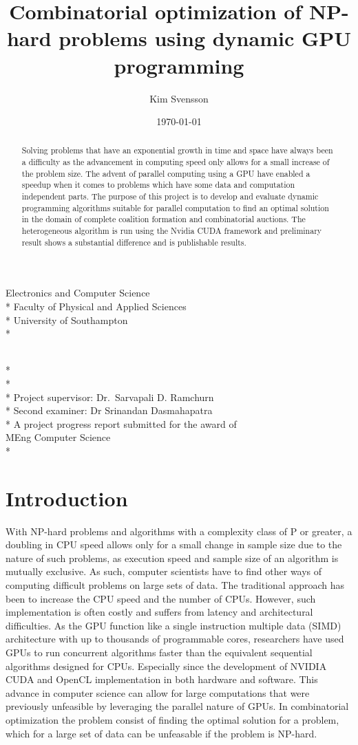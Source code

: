 \documentclass[a4paper, 12pt]{report}
\newcommand{\tdegree}{A project progress report submitted for the award of\\}
\newcommand{\degree}{\tdegree MEng Computer Science\\*}
\newcommand{\texam}{Second examiner: }
\newcommand{\exam}{\texam Dr Srinandan Dasmahapatra}
\newcommand{\tsupervisor}{Project supervisor: }
\newcommand{\supervisor}{\tsupervisor Dr.\ Sarvapali D. Ramchurn}
\newcommand{\school}{Electronics and Computer Science \\*
Faculty of Physical and Applied Sciences\\*
University of Southampton\\*}
\newenvironment{changemargin}[2]{%
\begin{list}{}{%
\setlength{\topsep}{0pt}%
\setlength{\leftmargin}{#1}%
\setlength{\rightmargin}{#2}%
\setlength{\listparindent}{\parindent}%
\setlength{\itemindent}{\parindent}%
\setlength{\parsep}{\parskip}%
}%
\item[]}{\end{list}}
\begin{document}
\author{Kim Svensson}
\date{\today}
\title{Combinatorial optimization of NP-hard problems using dynamic GPU programming}

\makeatletter
\begin{titlepage}
\begin{changemargin}{-2cm}{-2cm}
\begin{center}
\LARGE\school %

\LARGE
\vfill
\@author \\*
\@date \\*
\doublespacing
\@title \\*
\vfill
\singlespacing
\supervisor \\*
\exam \\*
\vfill
\degree
\end{center} 
\end{changemargin}
\end{titlepage}
\makeatother

\begin{abstract}
Solving problems that have an exponential growth in time and space have always been a difficulty as the advancement in computing speed only allows for a small increase of the problem size. The advent of parallel computing using a GPU have enabled a speedup when it comes to problems which have some data and computation independent parts.
The purpose of this project is to develop and evaluate dynamic programming algorithms suitable for parallel computation to find an optimal solution in the domain of complete coalition formation and combinatorial auctions. The heterogeneous algorithm is run using the Nvidia CUDA framework and preliminary result shows a substantial difference and is publishable results.

\end{abstract}
\tableofcontents
\newpage
\section{Introduction}

With NP-hard problems and algorithms with a complexity class of P or greater, 
a doubling in CPU speed allows only for a small change in sample size due to the nature of such problems, 
as execution speed and sample size of an algorithm is mutually exclusive.
As such, computer scientists have to find other ways of computing difficult problems on large sets of data.
The traditional approach has been to increase the CPU speed and the number of CPUs.
However, such implementation is often costly and suffers from latency and architectural difficulties.
As the GPU function like a single instruction multiple data (SIMD) architecture with up to thousands of programmable cores, 
researchers have used GPUs to run concurrent algorithms faster than the equivalent sequential algorithms designed for CPUs. Especially since the development of NVIDIA CUDA and OpenCL implementation in both hardware and software.
This advance in computer science can allow for large computations that were previously unfeasible by leveraging the parallel nature of GPUs. 
In combinatorial optimization the problem consist of finding the optimal solution for a problem, 
which for a large set of data can be unfeasable if the problem is NP-hard.
\end{document}
